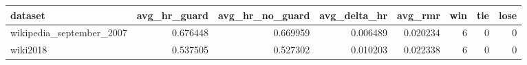 \begin{tabular}{lrrrrrrr}
\toprule
                 dataset &  avg\_hr\_guard &  avg\_hr\_no\_guard &  avg\_delta\_hr &  avg\_rmr &  win &  tie &  lose \\
\midrule
wikipedia\_september\_2007 &      0.676448 &         0.669959 &      0.006489 & 0.020234 &    6 &    0 &     0 \\
                wiki2018 &      0.537505 &         0.527302 &      0.010203 & 0.022338 &    6 &    0 &     0 \\
\bottomrule
\end{tabular}
